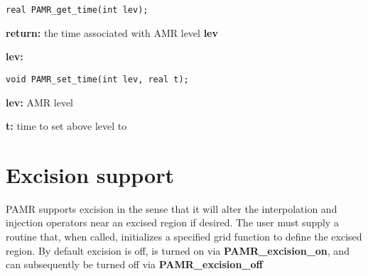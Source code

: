 \documentclass[aps,amssymb,unsortedaddress,nofootinbib]{revtex4}
\def\lsep{\itemsep 0.05in}
\begin{document}

\begin{verbatim}
real PAMR_get_time(int lev);
\end{verbatim}
\begin{list}{}{\lsep}
\item {\bf return:} the time associated with AMR level {\bf lev}
\item {\bf lev:} 
\end{list}


\begin{verbatim}
void PAMR_set_time(int lev, real t);
\end{verbatim}
\begin{list}{}{\lsep}
\item {\bf lev:} AMR level
\item {\bf t:} time to set above level to
\end{list}


\section{Excision support}

PAMR supports excision in the sense that it will alter the interpolation and injection
operators near an excised region if desired. The user must supply a routine
that, when called, initializes a specified grid function to define the excised 
region. By default excision is off, is turned on via {\bf PAMR\_excision\_on},
and can subsequently be turned off via {\bf PAMR\_excision\_off}

\end{document}
